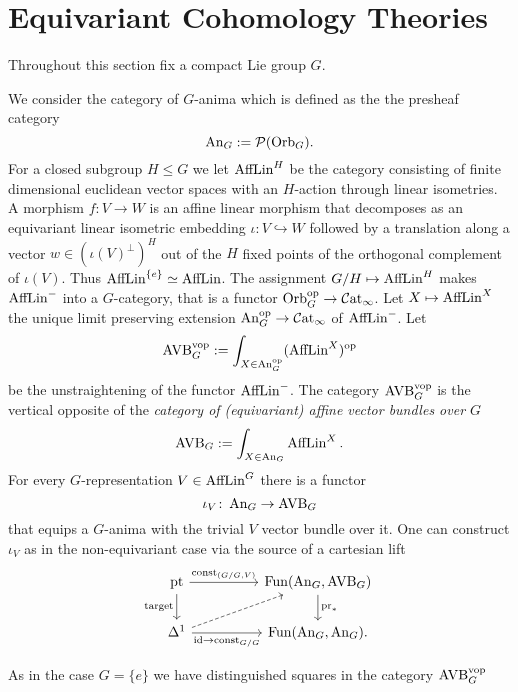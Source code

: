 \section{Equivariant Cohomology Theories}

Throughout this section fix a compact Lie group $G$.

\begin{definition}
We consider the category of $G$-anima which is defined as the the presheaf category 
\[
\operatorname{An}_G := \mathcal{P}(\mathrm{Orb}_G).
\]
For a closed subgroup $H \leq G$ we let $\operatorname{AffLin}^H$ be the category consisting of finite dimensional euclidean vector spaces with an 
$H$-action through linear isometries. A morphism $f \colon V \to W$ is an affine linear morphism that 
decomposes as an equivariant linear isometric embedding $\iota \colon V \hookrightarrow W$ followed by a translation along a vector 
$w \in (\iota(V)^\perp)^H$ out of the $H$ fixed points of the orthogonal complement of $\iota(V)$.
Thus $\operatorname{AffLin}^{\{e\}} \simeq \operatorname{AffLin}$.
The assignment $G/H \mapsto \operatorname{AffLin}^H$ makes $\operatorname{AffLin}^{-}$ into a $G$-category, that is a functor 
$\mathrm{Orb}_G^{\mathrm{op}} \to \mathcal{C}\mathrm{at}_{\infty}$.
Let $X \mapsto \operatorname{AffLin}^X$ the unique limit preserving extension $\operatorname{An}_G^{\mathrm{op}} \to \mathcal{C}\mathrm{at}_{\infty}$ of $\operatorname{AffLin}^{-}$.
Let 
\[
  \operatorname{AVB}^{\mathrm{vop}}_G := \int_{X \in \operatorname{An}_G^{\mathrm{op}}} (\operatorname{AffLin}^{X})^{\mathrm{op}}   
\]
be the unstraightening of the functor $\operatorname{AffLin}^{-}$.
The category $\operatorname{AVB}^{\mathrm{vop}}_G$ is the vertical opposite of the \emph{category of (equivariant) affine vector bundles over $G$} 
\[
  \operatorname{AVB}_G := \int_{X \in \operatorname{An}_G} \operatorname{AffLin}^X.
\]
For every $G$-representation $V \in \operatorname{AffLin}^G$ there is a functor 
\[
\iota_V \colon \operatorname{An}_G \to \operatorname{AVB}_G    
\]
that equips a $G$-anima with the trivial $V$ vector bundle over it. One can construct $\iota_V$ 
as in the non-equivariant case via the source of a cartesian lift 
\[\begin{tikzcd}
	\pt && {\Fun(\An_G,\AVB_G)} \\
	{\Delta^1} && {\Fun(\An_G,\An_G)}
	\arrow["{\pr_*}", from=1-3, to=2-3]
	\arrow["{\id \to \mathrm{const}_{G/G}}"', from=2-1, to=2-3]
	\arrow["{\mathrm{const}_{(G/G,V)}}", from=1-1, to=1-3]
	\arrow["{\mathrm{target}}"', from=1-1, to=2-1]
	\arrow[dashed, from=2-1, to=1-3].
\end{tikzcd}\]

As in the case $G = \{e\}$ we have distinguished squares in the category $\operatorname{AVB}^{\mathrm{vop}}_G$





\end{definition}
